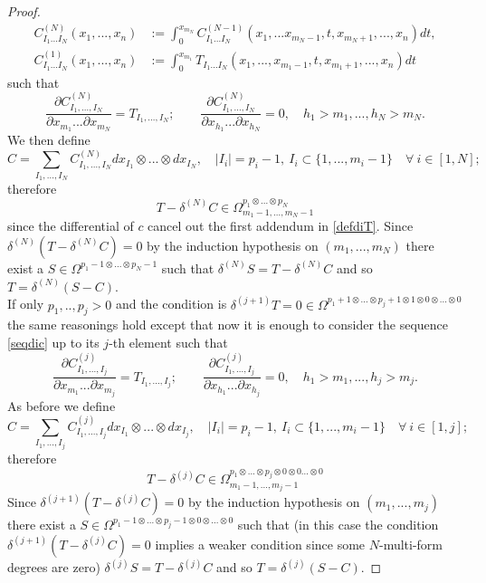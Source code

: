 \documentclass[a4paper,12pt]{article}
\begin{document}
\begin{proof}
\begin{equation}
\begin{aligned}
     C^{(N)}_{I_1...I_N}(x_1,...,x_n)&:=\int_0^{x_{m_N}} C^{(N-1)}_{I_1...I_N}(x_1,...x_{m_N-1},t,x_{m_N+1},...,x_n)dt, \\
        C^{(1)}_{I_1...I_N}(x_1,...,x_n)&:=\int_0^{x_{m_1}} T_{I_1...I_N}(x_1,...,x_{m_1-1},t,x_{m_1+1},...,x_n)dt
     \end{aligned}    
     \label{seqdic}
    \end{equation}
   such that 
   \begin{equation}
    \frac{\partial C^{(N)}_{I_1,...,I_N}}{\partial x_{m_1}...\partial x_{m_N}}=T_{I_1,...,I_N}; \qquad \frac{\partial C^{(N)}_{I_1,...,I_N}}{\partial x_{h_1}...\partial x_{h_N}}=0, \quad h_1>m_1,...,h_N>m_N.
   \end{equation}
   We then define
   \begin{equation}
       C=\sum_{{I_1,...,I_N}}C^{(N)}_{I_1,...,I_N}dx_{I_1} \otimes ... \otimes dx_{I_N}, \quad |I_i|=p_i-1, \ I_i \subset \{1,...,m_i-1\} \quad \forall \ i \in [1,N];
   \end{equation}
   therefore
   \begin{equation}
       T-\delta^{(N)}C \in \Omega^{p_1 \otimes ... \otimes p_N}_{m_1-1,...,m_N-1}
   \end{equation}
   since the differential of $c$ cancel out the first addendum in \eqref{defdiT}. Since $\delta^{(N)}(T-\delta^{(N)}C)=0$ by the induction hypothesis on $(m_1,...,m_N)$ there exist a $S \in \Omega^{p_1-1 \otimes ... \otimes p_N-1}$ such that $\delta^{(N)}S=T-\delta^{(N)}C$ and so $T=\delta^{(N)}(S-C)$. \\
   If only $p_1,..,p_j >0$ and the condition is $\delta^{(j+1)}T=0 \in \Omega^{p_1+1 \otimes ... \otimes p_j+1 \otimes 1 \otimes 0 \otimes ... \otimes 0}$ the same reasonings hold except that now it is enough to consider the sequence \ref{seqdic} up to its $j$-th element such that 
   \begin{equation}
    \frac{\partial C^{(j)}_{I_1,...,I_j}}{\partial x_{m_1}...\partial x_{m_j}}=T_{I_1,...,I_j}; \qquad \frac{\partial C^{(j)}_{I_1,...,I_j}}{\partial x_{h_1}...\partial x_{h_j}}=0, \quad h_1>m_1,...,h_j>m_j.
   \end{equation}
    As before we define
   \begin{equation}
   C=\sum_{{I_1,...,I_j}}C^{(j)}_{I_1,...,I_j}dx_{I_1} \otimes ... \otimes dx_{I_j}, \quad |I_i|=p_i-1, \ I_i \subset \{1,...,m_i-1\} \quad \forall \ i \in [1,j];
   \end{equation}
   therefore
   \begin{equation}
       T-\delta^{(j)}C \in \Omega^{p_1 \otimes ... \otimes p_j\otimes 0 \otimes 0... \otimes 0}_{m_1-1,...,m_j-1}
   \end{equation}
   Since $\delta^{(j+1)}(T-\delta^{(j)}C)=0$ by the induction hypothesis on $(m_1,...,m_j)$ there exist a $S \in \Omega^{p_1-1 \otimes ... \otimes p_j-1 \otimes 0 \otimes ... \otimes 0 }$ such that (in this case the condition $\delta^{(j+1)}(T-\delta^{(j)}C)=0$ implies a weaker condition since some $N$-multi-form degrees are zero) $\delta^{(j)}S=T-\delta^{(j)}C$ and so $T=\delta^{(j)}(S-C)$. 

\end{proof}
\end{document}
